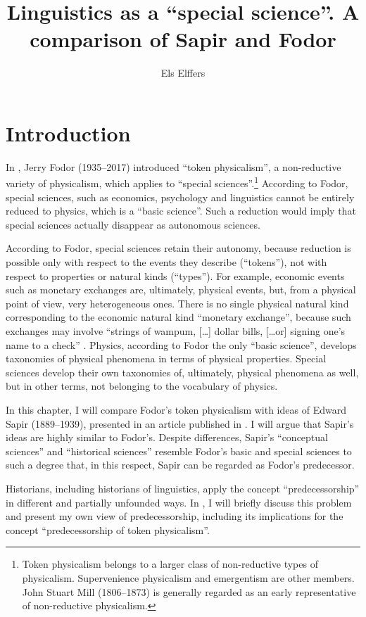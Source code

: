 \documentclass[output=paper]{langscibook}
\author{Els Elffers}
\title{Linguistics as a ``special science''. A comparison of Sapir and Fodor}
\begin{document}
\maketitle

\section{Introduction} 
\label{sec:elffers:intro}
In \citeyear{Fodor1974}, Jerry Fodor (1935--2017) introduced ``token physicalism'', a non-reductive variety of physicalism, which applies to ``special sciences''.\footnote{Token physicalism belongs to a larger class of non-reductive types of physicalism. Supervenience physicalism and emergentism are other members. John Stuart Mill (1806--1873) is generally regarded as an early representative of non-reductive physicalism.} According to Fodor, special sciences, such as economics, psychology and linguistics cannot be entirely reduced to physics, which is a ``basic science''. Such a reduction would imply that special sciences actually disappear as autonomous sciences. 

According to Fodor, special sciences retain their autonomy, because reduction is possible only with respect to the events they describe (``tokens''), not with respect to properties or natural kinds (``types''). For example, economic events such as monetary exchanges are, ultimately, physical events, but, from a physical point of view, very heterogeneous ones. There is no single physical natural kind corresponding to the economic natural kind ``monetary exchange'', because such exchanges may involve ``strings of wampum, […] dollar bills, […or] signing one's name to a check'' \citep[103]{Fodor1974}. Physics, according to Fodor the only ``basic science'', develops taxonomies of physical phenomena in terms of physical properties. Special sciences develop their own taxonomies of, ultimately, physical phenomena as well, but in other terms, not belonging to the vocabulary of physics.

In this chapter, I will compare Fodor's token physicalism with ideas of Edward Sapir (1889--1939), presented in an article published in \citeyear{Sapir1917}. I will argue that Sapir's ideas are highly similar to Fodor's. Despite differences, Sapir's ``conceptual sciences'' and ``historical sciences'' resemble Fodor's basic and special sciences to such a degree that, in this respect, Sapir can be regarded as Fodor's predecessor.\label{q:elffers:probsols}

Historians, including historians of linguistics, apply the concept ``predecessorship'' in different and partially unfounded ways. In , I will briefly discuss this problem and present my own view of predecessorship, including its implications for the concept ``predecessorship of token physicalism''.
\end{document}
